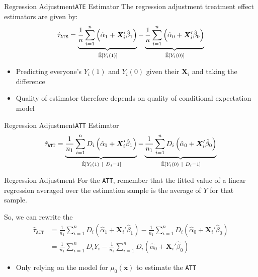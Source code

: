 \documentclass[aspectratio=169,t,11pt,table]{beamer}
\begin{document}
\begin{frame}{Regression Adjustment}{\texttt{ATE} Estimator}
  The \alert{regression adjustment treatment effect estimators} are given by:
  $$
    \hat{\tau}_{\texttt{ATE}} = 
    \underbrace{
      \frac{1}{n} \sum_{i=1}^n \left( \hat{\alpha}_1 + \bm{X}_i' \hat{\beta}_1 \right)
    }_{\expechat{Y_i(1)}} -
    \underbrace{
      \frac{1}{n} \sum_{i=1}^n \left( \hat{\alpha}_0 + \bm{X}_i' \hat{\beta}_0 \right)
    }_{\expechat{Y_i(0)}} 
  $$
  \begin{itemize}
    \item Predicting everyone's $Y_i(1)$ and $Y_i(0)$ given their $\bm{X}_i$ and taking the difference
    \item Quality of estimator therefore depends on quality of conditional expectation model
  \end{itemize}
\end{frame}

\begin{frame}{Regression Adjustment}{\texttt{ATT} Estimator}
  $$
    \hat{\tau}_{\texttt{ATT}} = 
    \underbrace{
      \frac{1}{n_1} \sum_{i=1}^n D_i \left( \hat{\alpha}_1 + \bm{X}_i' \hat{\beta}_1 \right)
    }_{\expechat{Y_i(1)}{D_i = 1}} - 
    \underbrace{
      \frac{1}{n_1} \sum_{i=1}^n D_i \left( \hat{\alpha}_0 + \bm{X}_i' \hat{\beta}_0 \right)
    }_{\expechat{Y_i(0)}{D_i = 1}} 
  $$
\end{frame}

\begin{frame}{Regression Adjustment}
  For the \texttt{ATT}, remember that the fitted value of a linear regression averaged over the estimation sample is the average of $Y$ for that sample.
  
  \bigskip
  So, we can rewrite the 
  \begin{align*}
    \hat{\tau}_{\texttt{ATT}} &= 
    \frac{1}{n_1} \sum_{i=1}^n D_i \left( \hat{\alpha}_1 + \bm{X}_i' \hat{\beta}_1 \right) -
    \frac{1}{n_1} \sum_{i=1}^n D_i \left( \hat{\alpha}_0 + \bm{X}_i' \hat{\beta}_0 \right) \\ 
    &= \frac{1}{n_1} \sum_{i=1}^n D_i Y_i - 
    \frac{1}{n_1} \sum_{i=1}^n D_i \left( \hat{\alpha}_0 + \bm{X}_i' \hat{\beta}_0 \right) 
  \end{align*}
  \begin{itemize}
    \item Only relying on the model for $\mu_{0}(\bm{x})$ to estimate the \texttt{ATT}
  \end{itemize}
\end{frame}
\end{document}
